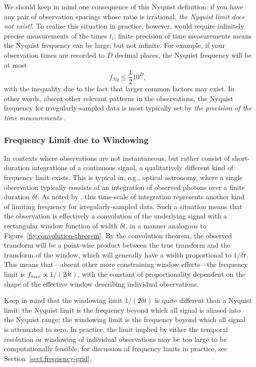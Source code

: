 \documentclass[preprint]{aastex}
\newcommand{\fig}[1]{Figure~\ref{fig:#1}}
\newcommand{\eqlabel}[1]{\label{eq:#1}}
\newcommand{\Sect}[1]{Section~\ref{sect:#1}}
\newcommand{\sect}[1]{\Sect{#1}}
\begin{document}
We should keep in mind one consequence of this Nyquist definition:
if you have any pair of observation spacings
whose ratio is irrational, {\it the Nyquist limit does not exist!}.
To realize this situation in practice, however,
would require infinitely precise measurements of the
times $t_i$; finite precision of time measurements means the Nyquist
frequency can be large, but not infinite.
For example, if your observation times are recorded to $D$ decimal places,
the Nyquist frequency will be at most
\begin{equation}
  f_{Ny} \le \frac{1}{2} 10^D,
  \eqlabel{nonuniform-nyquist}
\end{equation}
with the inequality due to the fact that larger common factors may exist.
In other words, absent other relevant patterns in the observations,
the Nyquist frequency for irregularly-sampled data is most
typically set by {\it the precision of the time measurements}
\citep[see also][for more rigorous treatments
  of this result]{Bretthorst2003, Koen2006}.

\subsubsection{Frequency Limit due to Windowing}

In contexts where observations are not instantaneous, but rather consist of
short-duration integrations of a continuous signal, a qualitatively different
kind of frequency limit exists.
This is typical in, e.g., optical astronomy, where a single observation typically consists of an integration of observed photons over a finite duration $\delta t$.
As noted by \citet{ICVG2014}, this time-scale of integration represents another
kind of limiting frequency for irregularly-sampled data.
Such a situation means that the observation is effectively a convolution of
the underlying signal with a rectangular window function of width $\delta t$,
in a manner analogous to \fig{convolution-theorem}.
By the convolution theorem, the observed transform will be a point-wise
product between the true transform and the transform of the window, which
will generally have a width proportional to $1/\delta t$.
This means that---absent other more constraining window effects---the
frequency limit is $f_{max} \propto 1/(2\delta t)$, with the constant of
proportionality dependent on the shape of the effective window describing
individual observations.

Keep in mind that the windowing limit $1/(2\delta t)$ is quite different than a
Nyquist limit: the Nyquist limit is the frequency beyond which all signal
is aliased into the Nyquist range; the windowing limit is the frequency
beyond which all signal is attenuated to zero.
In practice, the limit implied by either the temporal resolution or windowing
of individual observations may be too large to be computationally feasible;
for discussion of frequency limits in practice, see \sect{frequency-grid}.
\end{document}
